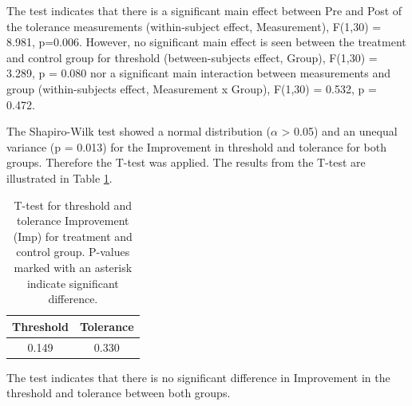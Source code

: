 \noindent
The test indicates that there is a significant main effect between Pre and Post of the tolerance measurements (within-subject effect, Measurement), F(1,30) = 8.981, p=0.006. However, no significant main effect is seen between the treatment and control group for threshold (between-subjects effect, Group), F(1,30) = 3.289, p = 0.080 nor a significant main interaction between  measurements and group (within-subjects effect, Measurement x Group), F(1,30) = 0.532, p = 0.472.

The Shapiro-Wilk test showed a normal distribution ($\alpha$ > 0.05) and an unequal variance (p = 0.013) for the Improvement in threshold and tolerance for both groups. Therefore the T-test was applied. The results from the T-test are illustrated in Table \ref{table:TTEST}. 

\begin{table}[ht]
\caption{T-test for threshold and tolerance Improvement (Imp) for treatment and control group. P-values marked with an asterisk indicate significant difference.}
\centering
\begin{tabular}{c c}
\toprule
\textbf{Threshold} & \textbf{Tolerance} \\
\midrule
 0.149 &  0.330 \\
\hline
\end{tabular}
\label{table:TTEST}
\end{table}

\noindent
The test indicates that there is no significant difference in Improvement in the threshold and tolerance between both groups.